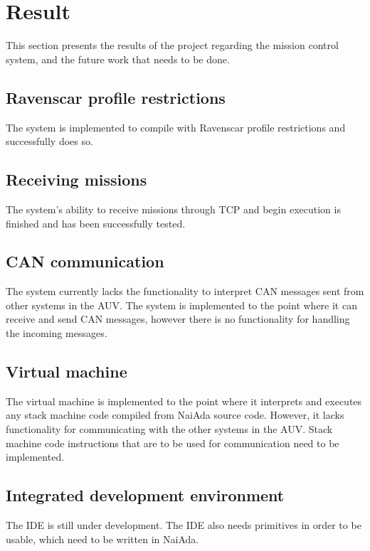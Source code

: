 \section{Result}\label{sec:result}
This section presents the results of the project regarding the mission control system, and the future work that needs to be done. 
\subsection{Ravenscar profile restrictions}
The system is implemented to compile with Ravenscar profile restrictions \cite{article:mcsraven} and successfully does so.

\subsection{Receiving missions}
The system's ability to receive missions through TCP and begin execution is finished and has been successfully tested.

\subsection{CAN communication}
The system currently lacks the functionality to interpret CAN messages sent from other systems in the AUV. The system is implemented to the point where it can receive and send CAN messages, however there is no functionality for handling the incoming messages.

\subsection{Virtual machine}
The virtual machine is implemented to the point where it interprets and executes any stack machine code compiled from NaiAda source code. However, it lacks functionality for communicating with the other systems in the AUV. Stack machine code instructions that are to be used for communication need to be implemented.

\subsection{Integrated development environment}
The IDE is still under development. The IDE also needs primitives in order to be usable, which need to be written in NaiAda.

